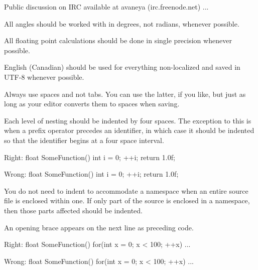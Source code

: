     Public discussion on IRC available at \type{#}avaneya (irc.freenode.net)
    ...
\stoptyping
\StopCodeExample


\startitemize[3]
\setupwhitespace[big]
\item
All angles should be worked with in degrees, not radians, whenever possible.

\item
All floating point calculations should be done in single precision whenever possible.
\stopitemize


\startitemize[3]
\setupwhitespace[big]
\item
English (Canadian) should be used for everything non-localized and saved in UTF-8 whenever possible.

\item
Always use spaces and not tabs. You can use the latter, if you like, but just as long as your editor converts them to spaces when saving.

\item
Each level of nesting should be indented by four spaces. The exception to this is when a prefix operator precedes an identifier, in which case it should be indented so that the identifier begins at a four space interval.

Right:
\StartCodeExample
\starttyping
float SomeFunction()
{
    int i = 0;
  ++i;
    return 1.0f;
}
\stoptyping
\StopCodeExample

Wrong:
\StartCodeExample
\starttyping
float SomeFunction()
{
    int i = 0;
    ++i;
        return 1.0f;
}
\stoptyping
\StopCodeExample

\item
You do not need to indent to accommodate a namespace when an entire source file is enclosed within one. If only part of the source is enclosed in a namespace, then those parts affected should be indented.

\item
An opening brace appears on the next line as preceding code.

Right:
\StartCodeExample
\starttyping
float SomeFunction()
{
    for(int x = 0; x < 100; ++x)
    {
        ...
    }
}
\stoptyping
\StopCodeExample

Wrong:
\StartCodeExample
\starttyping
float SomeFunction() {
    for(int x = 0; x < 100; ++x) {
        ...
    }
}
\stoptyping
\StopCodeExample

